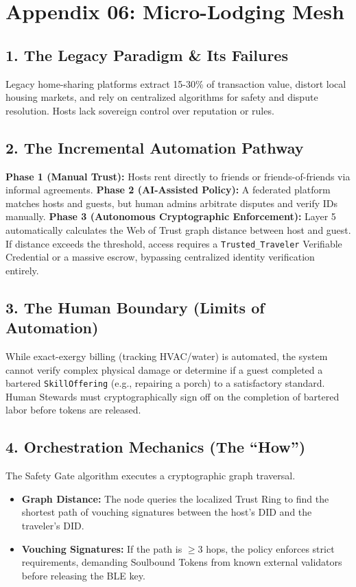 \chapter*{Appendix 06: Micro-Lodging Mesh}

\section*{1. The Legacy Paradigm \& Its Failures}
Legacy home-sharing platforms extract 15-30\% of transaction value, distort local housing markets, and rely on centralized algorithms for safety and dispute resolution. Hosts lack sovereign control over reputation or rules.

\section*{2. The Incremental Automation Pathway}
\textbf{Phase 1 (Manual Trust):} Hosts rent directly to friends or friends-of-friends via informal agreements.
\textbf{Phase 2 (AI-Assisted Policy):} A federated platform matches hosts and guests, but human admins arbitrate disputes and verify IDs manually.
\textbf{Phase 3 (Autonomous Cryptographic Enforcement):} Layer 5 automatically calculates the Web of Trust graph distance between host and guest. If distance exceeds the threshold, access requires a \texttt{Trusted\_Traveler} Verifiable Credential or a massive escrow, bypassing centralized identity verification entirely.

\section*{3. The Human Boundary (Limits of Automation)}
While exact-exergy billing (tracking HVAC/water) is automated, the system cannot verify complex physical damage or determine if a guest completed a bartered \texttt{SkillOffering} (e.g., repairing a porch) to a satisfactory standard. Human Stewards must cryptographically sign off on the completion of bartered labor before tokens are released.

\section*{4. Orchestration Mechanics (The ``How'')}
The Safety Gate algorithm executes a cryptographic graph traversal. 
\begin{itemize}
    \item \textbf{Graph Distance:} The node queries the localized Trust Ring to find the shortest path of vouching signatures between the host's DID and the traveler's DID.
    \item \textbf{Vouching Signatures:} If the path is $\ge 3$ hops, the policy enforces strict requirements, demanding Soulbound Tokens from known external validators before releasing the BLE key.
\end{itemize}
